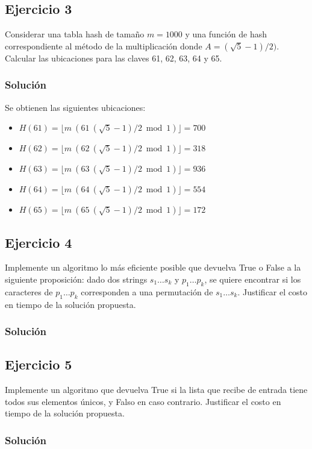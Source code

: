 \documentclass{article}
\begin{document}
\subsection*{Ejercicio 3}
Considerar una tabla hash de tamaño $m = 1000$ y una función de hash correspondiente al método de la multiplicación donde $A = (\sqrt{5}-1)/2)$. Calcular las ubicaciones para las claves 61, 62, 63, 64 y 65.
\subsubsection*{Solución}
Se obtienen las siguientes ubicaciones:
\begin{itemize}
    \item $H(61) = \lfloor m\ (61\ (\sqrt{5}-1)/2 \bmod 1) \rfloor = 700$
    \item $H(62) = \lfloor m\ (62\ (\sqrt{5}-1)/2 \bmod 1) \rfloor = 318$
    \item $H(63) = \lfloor m\ (63\ (\sqrt{5}-1)/2 \bmod 1) \rfloor = 936$
    \item $H(64) = \lfloor m\ (64\ (\sqrt{5}-1)/2 \bmod 1) \rfloor = 554$
    \item $H(65) = \lfloor m\ (65\ (\sqrt{5}-1)/2 \bmod 1) \rfloor = 172$
\end{itemize}


\pagebreak
\subsection*{Ejercicio 4}
Implemente un algoritmo lo más eficiente posible que devuelva True o False a la siguiente proposición: dado dos strings $s_1 \dots s_k$ y $p_1 \dots p_k$, se quiere encontrar si los caracteres de $p_1 \dots p_k$ corresponden a una permutación de $s_1 \dots s_k$. Justificar el costo en tiempo de la solución propuesta.
\subsubsection*{Solución}


\pagebreak
\subsection*{Ejercicio 5}
Implemente un algoritmo que devuelva True si la lista que recibe de entrada tiene todos sus elementos únicos, y Falso en caso contrario. Justificar el costo en tiempo de la solución propuesta.
\subsubsection*{Solución}
\end{document}
